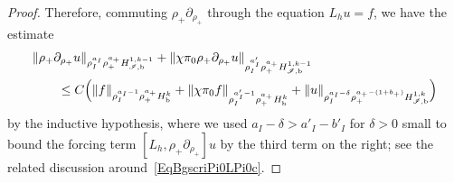 \documentclass[reqno,11pt,letterpaper]{amsart}
\numberwithin{equation}{section}
\numberwithin{figure}{section}
\theoremstyle{definition}
\theoremstyle{remark}
\newcommand{\ms}{\mathscr}
\newcommand{\scri}{\ms I}
\newcommand{\pa}{\partial}
\newcommand{\bop}{{\mathrm{b}}}
\newcommand{\Hb}{H_{\bop}}
\newcommand{\Hscrib}{H_{\scri,\bop}}
\begin{document}
\begin{proof}
  Therefore, commuting $\rho_+\pa_{\rho_+}$ through the equation $L_h u=f$, we have the estimate
  \begin{equation}
  \label{EqBgipHigher1}
  \begin{split}
    &\|\rho_+\pa_{\rho_+}u\|_{\rho_I^{a_I}\rho_+^{a_+}\Hscrib^{1,k-1}} + \|\chi\pi_0\rho_+\pa_{\rho_+}u\|_{\rho_I^{a'_I}\rho_+^{a_+}\Hscrib^{1,k-1}} \\
      &\qquad \leq C\Bigl( \|f\|_{\rho_I^{a_I-1}\rho_+^{a_+}\Hb^k} + \|\chi\pi_0 f\|_{\rho_I^{a'_I-1}\rho_+^{a_+}\Hb^k} + \|u\|_{\rho_I^{a_I-\delta}\rho_+^{a_+-(1+b_+)}\Hscrib^{1,k}}\Bigr)
  \end{split}
  \end{equation}
  by the inductive hypothesis, where we used $a_I-\delta>a'_I-b'_I$ for $\delta>0$ small to bound the forcing term $[L_h,\rho_+\pa_{\rho_+}]u$ by the third term on the right; see the related discussion around~\eqref{EqBgscriPi0LPi0c}.
  

\end{proof}
\end{document}
